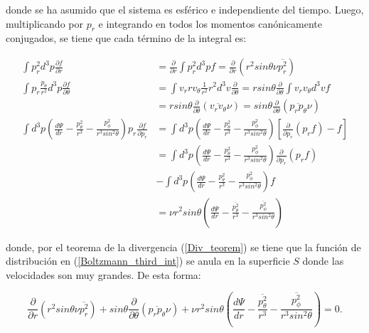 donde se ha asumido que el sistema es esférico e independiente del tiempo. Luego, multiplicando por $p_r$ e integrando en todos los momentos canónicamente conjugados, se tiene que cada término de la integral es:

\begin{align}
\int p_r^2 d^3 p \frac{\partial f}{\partial r} &= \frac{\partial }{\partial r} \int p_r^2 d^3 p f = \frac{\partial }{\partial r} (r^2 sin \theta \nu \overline{p_r^2}) \\
\int p_r \frac{p_\theta}{r^2} d^3 p \frac{\partial f}{\partial \theta} &= \int v_r r v_\theta \frac{1}{r^2} r^2 d^3 v \frac{\partial }{\partial \theta} = r sin \theta \frac{\partial }{\partial \theta} \int v_r v_\theta d^3v f \\
& = r sin \theta \frac{\partial }{\partial \theta} (\overline{v_r v_\theta } \nu) = sin \theta \frac{\partial }{\partial \theta} (\overline{p_r p_\theta } \nu) \\
\int d^3 p \left ( \frac{d \Psi}{d r}  - \frac{p_\theta^2}{r^3} - \frac{p_\phi^2}{r^3 sin^2\theta} \right ) p_r \frac{\partial f}{\partial p_r} & = \int  d^3 p \left ( \frac{d \Psi}{d r} - \frac{p_\theta^2}{r^3} - \frac{p_\phi^2}{r^3 sin^2\theta} \right ) \left [ \frac{\partial }{\partial p_r} (p_r f) - f \right ] \\
\label{Boltzmann_third_int}
& = \int  d^3 p \left ( \frac{d \Psi}{d r} - \frac{p_\theta^2}{r^3} - \frac{p_\phi^2}{r^3 sin^2\theta} \right ) \frac{\partial }{\partial p_r} (p_r f)\\
&- \int  d^3 p \left ( \frac{d \Psi}{d r} - \frac{p_\theta^2}{r^3} - \frac{p_\phi^2}{r^3 sin^2\theta} \right ) f \\
& = \nu r^2 sin \theta \left ( \frac{d \Psi}{d r} - \frac{ \overline{p_\theta^2} }{r^3} - \frac{ \overline{p_\phi^2} }{r^3 sin^2\theta} \right )
\end{align}

donde, por el teorema de la divergencia (\ref{Div_teorem}) se tiene que la función de distribución en (\ref{Boltzmann_third_int}) se anula en la superficie $S$ donde las velocidades son muy grandes. De esta forma:

\begin{equation}
\frac{\partial }{\partial r} (r^2 sin \theta \nu \overline{p_r^2}) + sin \theta \frac{\partial }{\partial \theta} (\overline{p_r p_\theta } \nu) + \nu r^2 sin \theta \left ( \frac{d \Psi}{d r} - \frac{ \overline{p_\theta^2} }{r^3} - \frac{ \overline{p_\phi^2} }{r^3 sin^2\theta} \right ) = 0.
\end{equation}

